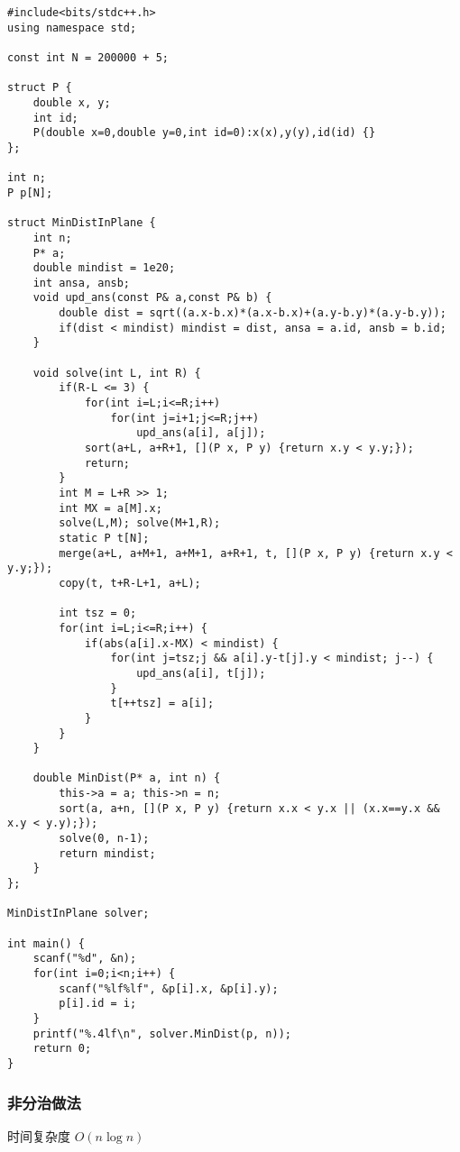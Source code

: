 \documentclass[UTF8]{ctexart}
\begin{document}
\begin{framed}
\begin{lstlisting}
#include<bits/stdc++.h>
using namespace std;

const int N = 200000 + 5;

struct P {
    double x, y;
    int id;
    P(double x=0,double y=0,int id=0):x(x),y(y),id(id) {}
};

int n;
P p[N];

struct MinDistInPlane {
    int n;
    P* a;
    double mindist = 1e20;
    int ansa, ansb;
    void upd_ans(const P& a,const P& b) {
        double dist = sqrt((a.x-b.x)*(a.x-b.x)+(a.y-b.y)*(a.y-b.y));
        if(dist < mindist) mindist = dist, ansa = a.id, ansb = b.id;
    }
    
    void solve(int L, int R) {
        if(R-L <= 3) {
            for(int i=L;i<=R;i++)
                for(int j=i+1;j<=R;j++) 
                    upd_ans(a[i], a[j]);
            sort(a+L, a+R+1, [](P x, P y) {return x.y < y.y;});
            return;
        }
        int M = L+R >> 1;
        int MX = a[M].x;
        solve(L,M); solve(M+1,R);
        static P t[N];
        merge(a+L, a+M+1, a+M+1, a+R+1, t, [](P x, P y) {return x.y < y.y;});
        copy(t, t+R-L+1, a+L);
        
        int tsz = 0;
        for(int i=L;i<=R;i++) {
            if(abs(a[i].x-MX) < mindist) {
                for(int j=tsz;j && a[i].y-t[j].y < mindist; j--) {
                    upd_ans(a[i], t[j]);
                }
                t[++tsz] = a[i];
            }
        }
    }
    
    double MinDist(P* a, int n) {
        this->a = a; this->n = n;
        sort(a, a+n, [](P x, P y) {return x.x < y.x || (x.x==y.x && x.y < y.y);});
        solve(0, n-1);
        return mindist;
    }
};

MinDistInPlane solver;

int main() {
    scanf("%d", &n);
    for(int i=0;i<n;i++) {
        scanf("%lf%lf", &p[i].x, &p[i].y);
        p[i].id = i;
    }
    printf("%.4lf\n", solver.MinDist(p, n));
    return 0;
}
\end{lstlisting}
\end{framed}

\subsubsection{非分治做法}

时间复杂度 $O(n \log n)$
\end{document}
